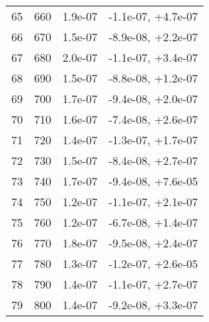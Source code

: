 \begin{table}
\begin{adjustbox}{width=1\textwidth/2}
\begin{tabular}{|c|c|c|c|}
\cline{1-4}
65 & 660 & 1.9e-07 & -1.1e-07, +4.7e-07 \\
\cline{1-4}
66 & 670 & 1.5e-07 & -8.9e-08, +2.2e-07 \\
\cline{1-4}
67 & 680 & 2.0e-07 & -1.1e-07, +3.4e-07 \\
\cline{1-4}
68 & 690 & 1.5e-07 & -8.8e-08, +1.2e-07 \\
\cline{1-4}
69 & 700 & 1.7e-07 & -9.4e-08, +2.0e-07 \\
\cline{1-4}
70 & 710 & 1.6e-07 & -7.4e-08, +2.6e-07 \\
\cline{1-4}
71 & 720 & 1.4e-07 & -1.3e-07, +1.7e-07 \\
\cline{1-4}
72 & 730 & 1.5e-07 & -8.4e-08, +2.7e-07 \\
\cline{1-4}
73 & 740 & 1.7e-07 & -9.4e-08, +7.6e-05 \\
\cline{1-4}
74 & 750 & 1.2e-07 & -1.1e-07, +2.1e-07 \\
\cline{1-4}
75 & 760 & 1.2e-07 & -6.7e-08, +1.4e-07 \\
\cline{1-4}
76 & 770 & 1.8e-07 & -9.5e-08, +2.4e-07 \\
\cline{1-4}
77 & 780 & 1.3e-07 & -1.2e-07, +2.6e-05 \\
\cline{1-4}
78 & 790 & 1.4e-07 & -1.1e-07, +2.7e-07 \\
\cline{1-4}
79 & 800 & 1.4e-07 & -9.2e-08, +3.3e-07 \\
\cline{1-4}
\end{tabular}
\end{adjustbox}
\end{table}

